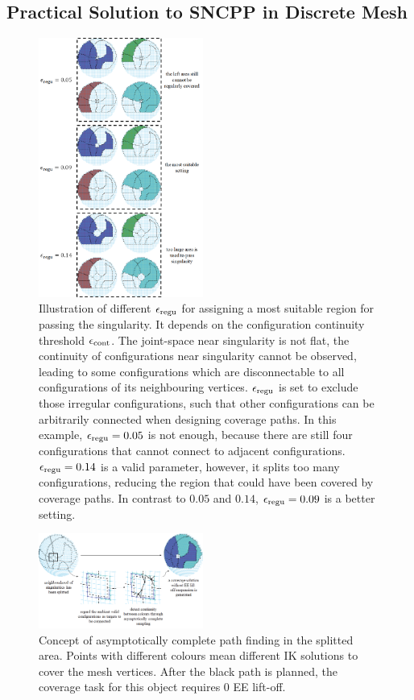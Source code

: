 \documentclass[Afour,sageh,times]{sagej}
\begin{document}
\subsection{Practical Solution to SNCPP in Discrete Mesh}
\begin{figure}[t]
\centering
\includegraphics[width = 0.48\textwidth]{figures/exp_central_sphere/choose_threshold_2}
\caption{Illustration of different $\epsilon_{\rm regu}$ for assigning a most suitable region for passing the singularity. It depends on the configuration continuity threshold $\epsilon_{\rm cont}$. 
The joint-space near singularity is not flat, the continuity of configurations near singularity cannot be observed, leading to some configurations which are disconnectable to all configurations of its neighbouring vertices. 
$\epsilon_{\rm regu}$ is set to exclude those irregular configurations, such that other configurations can be arbitrarily connected when designing coverage paths. 
In this example, $\epsilon_{\rm regu} = 0.05$ is not enough, because there are still four configurations that cannot connect to adjacent configurations. 
$\epsilon_{\rm regu} = 0.14$ is a valid parameter, however, it splits too many configurations, reducing the region that could have been covered by coverage paths. 
In contrast to $0.05$ and $0.14$, $\epsilon_{\rm regu} = 0.09$ is a better setting. 
}\label{fig:choose_threshold}
\end{figure}

\begin{figure}[t]
\centering
\includegraphics[width = 0.48\textwidth]{figures/exp_central_sphere/complete_sampling/complete_sampling}
\caption{Concept of asymptotically complete path finding in the splitted area. Points with different colours mean different IK solutions to cover the mesh vertices. After the black path is planned, the coverage task for this object requires $0$ EE lift-off. }\label{fig:complete_sampling}
\end{figure}
\end{document}
